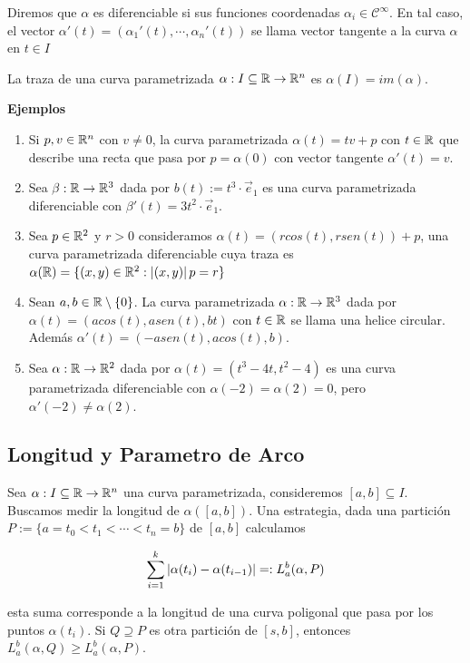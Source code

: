 \documentclass{article}
\begin{document}
\noindent Diremos que $\alpha$ es diferenciable si sus funciones coordenadas 
$\alpha_{i}\in\mathcal{C}^{\infty}$. En tal caso, el vector 
$\alpha'(t)=(\alpha_{1}'(t),\cdots,\alpha_{n}'(t))$ se llama vector tangente a la curva $\alpha$ en
$t\in I$

\begin{dfn}
    La traza de una curva parametrizada $\alpha:I\subseteq\mathbb{R}\to\mathbb{R}^{n}$ es $\alpha(I)=im(\alpha)$.
\end{dfn}

\noindent\textbf{Ejemplos}
\begin{enumerate}
    \item Si $p,v\in\mathbb{R}^{n}$ con $v\neq0$, la curva parametrizada $\alpha(t)=tv+p$ con $t\in\mathbb{R}$ 
    que describe una recta que pasa por $p=\alpha(0)$ con vector tangente $\alpha'(t)=v$.
    \item Sea $\beta:\mathbb{R}\to\mathbb{R}^{3}$ dada por $b(t):=t^{3}\cdot\overrightarrow{e}_{1}$ es una curva
    parametrizada diferenciable con $\beta'(t)=3t^{2}\cdot\overrightarrow{e}_{1}$.
    \item Sea $p\in\mathbb{R}^{2}$ y $r>0$ consideramos $\alpha(t)=(rcos(t),rsen(t))+p$, una curva
    parametrizada diferenciable cuya traza es $\alpha(\mathbb{R})=\{(x,y)\in\mathbb{R}^{2}:\left|(x,y) \right|{p}=r\}$
    \item Sean $a,b\in\mathbb{R}\setminus{\{0\}}$. La curva parametrizada $\alpha:\mathbb{R}\to\mathbb{R}^{3}$ dada por
    $\alpha(t)=(acos(t),asen(t),bt)$ con $t\in\mathbb{R}$ se llama una helice circular. 
    Además $\alpha'(t)=(-asen(t),acos(t),b)$.
    \item Sea $\alpha:\mathbb{R}\to\mathbb{R}^{2}$ dada por $\alpha(t)=(t^{3}-4t,t^{2}-4)$ es una curva 
    parametrizada diferenciable con $\alpha(-2)=\alpha(2)=0$, pero $\alpha'(-2)\neq\alpha(2)$.
\end{enumerate}

\subsection{Longitud y Parametro de Arco}
\noindent Sea $\alpha:I\subseteq\mathbb{R}\to\mathbb{R}^{n}$ una curva parametrizada, consideremos $[a,b]\subseteq I$.
Buscamos medir la longitud de $\alpha([a,b])$. Una estrategia, dada una partición $P:=\{a=t_{0}
<t_{1}<\cdots<t_{n}=b\}$ de $[a,b]$ calculamos

\begin{equation*}
    \displaystyle\sum_{i=1}^{k}\left|\alpha(t_{i})-\alpha(t_{i-1}) \right|=:L_{a}^{b}(\alpha,P)
\end{equation*}

\noindent esta suma corresponde a la longitud de una curva poligonal que pasa por los puntos 
$\alpha(t_{i})$. Si $Q\supseteq P$ es otra partición de $[s,b]$, entonces 
$L_{a}^{b}(\alpha,Q)\geq L_{a}^{b}(\alpha,P)$.
\end{document}
